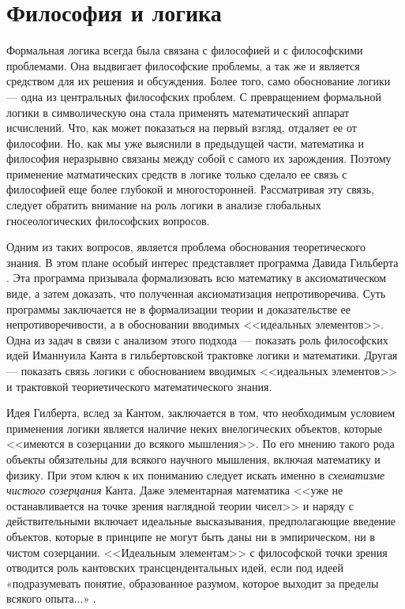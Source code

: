 \documentclass[a4page]{article}
\begin{document}
\section{Философия и логика}
Формальная логика всегда была связана с философией и с философскими проблемами.
Она выдвигает философские проблемы, а так же и является средством для их решения и обсуждения.
Более того, само обоснование логики --- одна из центральных философских проблем.
С превращением формальной логики в символическую она стала применять математический аппарат исчислений.
Что, как может показаться на первый взгляд, отдаляет ее от философии.
Но, как мы уже выяснили в предыдущей части,
математика и философия неразрывно связаны между собой с самого их зарождения.
Поэтому применение матматических средств в логике
только сделало ее связь с философией еще более глубокой и многосторонней.
Рассматривая эту связь,
следует обратить внимание на роль логики в анализе глобальных гносеологических философских вопросов.

Одним из таких вопросов, является проблема обоснования теоретического знания.
В этом плане особый интерес представляет программа Давида Гильберта \cite{sep-hilbert-program}.
Эта программа призывала формализовать всю математику в аксиоматическом виде,
а затем доказать, что полученная аксиоматизация непротиворечива.
Суть программы заключается не в формализации теории и доказательстве ее непротиворечивости,
а в обосновании вводимых <<идеальных элементов>>.
Одна из задач в связи с анализом этого подхода ---
показать роль философских идей Иманнуила Канта в гильбертовской трактовке логики и математики.
Другая --- показать связь логики с обоснованием вводимых <<идеальных элементов>>
и трактовкой теориетического математического знания.

Идея Гилберта, вслед за Кантом, заключается в том, что необходимым условием применения логики является
наличие неких внелогических объектов, которые <<имеются в созерцании до всякого мышления>>.
По его мнению такого рода объекты обязательны для всякого научного мышления, включая математику и физику.
При этом ключ к их пониманию следует искать именно в \textit{схематизме чистого созерцания} Канта.
Даже элементарная математика <<уже не останавливается на точке зрения наглядной теории чисел>>
и наряду с действительными включает идеальные высказывания, предполагающие введение объектов,
которые в принципе не могут быть даны ни в эмпирическом, ни в чистом созерцании.
<<Идеальным элементам>> с философской точки зрения отводится роль кантовских трансцендентальных идей,
если под идеей «подразумевать понятие, образованное разумом, которое выходит за пределы всякого опыта...»
\cite{the-foundations-of-geometry}.
\end{document}
